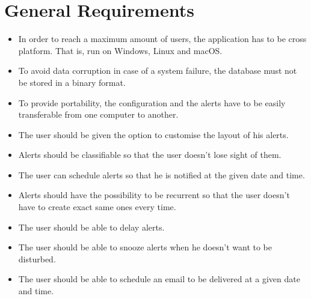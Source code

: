 \section{General Requirements}

\begin{itemize}
    \item In order to reach a maximum amount of users, the application has to
        be cross platform. That is, run on Windows, Linux and macOS.\@
    \item To avoid data corruption in case of a system failure, the database
        must not be stored in a binary format.
    \item To provide portability, the configuration and the alerts have to be
        easily transferable from one computer to another.
    \item The user should be given the option to customise the layout of his
        alerts.
    \item Alerts should be classifiable so that the user doesn't lose sight of
        them.
    \item The user can schedule alerts so that he is notified at the given date
        and time.
    \item Alerts should have the possibility to be recurrent so that the
        user doesn't have to create exact same ones every time.
    \item The user should be able to delay alerts.
    \item The user should be able to snooze alerts when he doesn't want to be
        disturbed.
    \item The user should be able to schedule an email to be delivered at a
        given date and time.

\end{itemize}


